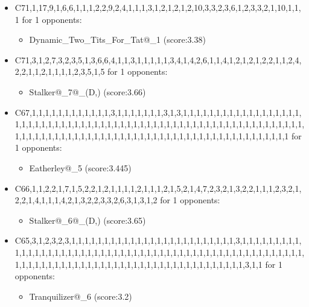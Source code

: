 \begin{appendices}
\begin{itemize}
        \item C71,1,17,9,1,6,6,1,1,1,2,2,9,2,4,1,1,1,3,1,2,1,2,1,2,10,3,3,2,3,6,1,2,3,3,2,1,10,1,1,1 for 1 opponents:
        \begin{multicols}{3}
            \begin{itemize}
                \item Dynamic\_Two\_Tits\_For\_Tat@\_1 (score:3.38)
            \end{itemize}
        \end{multicols}

        \item C71,3,1,2,7,3,2,3,5,1,3,6,6,4,1,1,3,1,1,1,1,1,3,4,1,4,2,6,1,1,4,1,2,1,2,1,2,2,1,1,2,4,2,2,1,1,2,1,1,1,1,2,3,5,1,5 for 1 opponents:
        \begin{multicols}{3}
            \begin{itemize}
                \item Stalker@\_7@\_(D,) (score:3.66)
            \end{itemize}
        \end{multicols}

        \item C67,1,1,1,1,1,1,1,1,1,1,1,1,3,1,1,1,1,1,1,1,3,1,3,1,1,1,1,1,1,1,1,1,1,1,1,1,1,1,1,1,1,1,1,1,1,1,1,1,1,1,1,1,1,1,1,1,1,1,1,1,1,1,1,1,1,1,1,1,1,1,1,1,1,1,1,1,1,1,1,1,1,1,1,1,1,1,1,1,1,1,1,1,1,1,1,1,1,1,1,1,1,1,1,1,1,1,1,1,1,1,1,1,1,1,1,1,1,1,1,1,1,1,1,1,1,1,1 for 1 opponents:
        \begin{multicols}{3}
            \begin{itemize}
                \item Eatherley@\_5 (score:3.445)
            \end{itemize}
        \end{multicols}

        \item C66,1,1,2,2,1,7,1,5,2,2,1,2,1,1,1,1,2,1,1,1,2,1,5,2,1,4,7,2,3,2,1,3,2,2,1,1,1,2,3,2,1,2,2,1,4,1,1,1,4,2,1,3,2,2,3,3,2,6,3,1,3,1,2 for 1 opponents:
        \begin{multicols}{3}
            \begin{itemize}
                \item Stalker@\_6@\_(D,) (score:3.65)
            \end{itemize}
        \end{multicols}

        \item C65,3,1,2,3,2,3,1,1,1,1,1,1,1,1,1,1,1,1,1,1,1,1,1,1,1,1,1,1,1,1,1,3,1,1,1,1,1,1,1,1,1,1,1,1,1,1,1,1,1,1,1,1,1,1,1,1,1,1,1,1,1,1,1,1,1,1,1,1,1,1,1,1,1,1,1,1,1,1,1,1,1,1,1,1,1,1,1,1,1,1,1,1,1,1,1,1,1,1,1,1,1,1,1,1,1,1,1,1,1,1,1,1,1,1,1,1,1,1,1,1,3,1,1 for 1 opponents:
        \begin{multicols}{3}
            \begin{itemize}
                \item Tranquilizer@\_6 (score:3.2)
            \end{itemize}
        \end{multicols}


\end{itemize}
\end{appendices}
